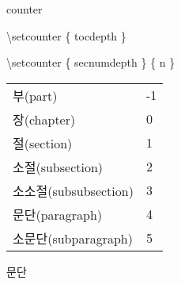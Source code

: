 \documentclass[10pt,xcolor=pdftex,dvipsnames,table,handout]{beamer}
\begin{document}
		\begin{frame}[t]{counter}

			\begin{block} {\textbackslash setcounter \{ tocdepth \} }
			\end{block}

			\begin{block} {\textbackslash setcounter \{ secnumdepth \} \{ n \} }
			\end{block}


			\begin{center}
			\begin{table}
			\begin{tabular}{ l l }
				\hline
				부(part)				&-1\\
				장(chapter)			&0\\
				절(section)			&1\\
				소절(subsection)		&2\\
				소소절(subsubsection)	&3\\
				문단(paragraph)		&4\\
				소문단(subparagraph)	&5\\
				\hline
			\end{tabular}
			\end{table}
			\end{center}











		\end{frame}

		\begin{frame}[plain]
		\end{frame}


		\begin{frame}[plain]
		\Huge{문단}
		\end{frame}
\end{document}
